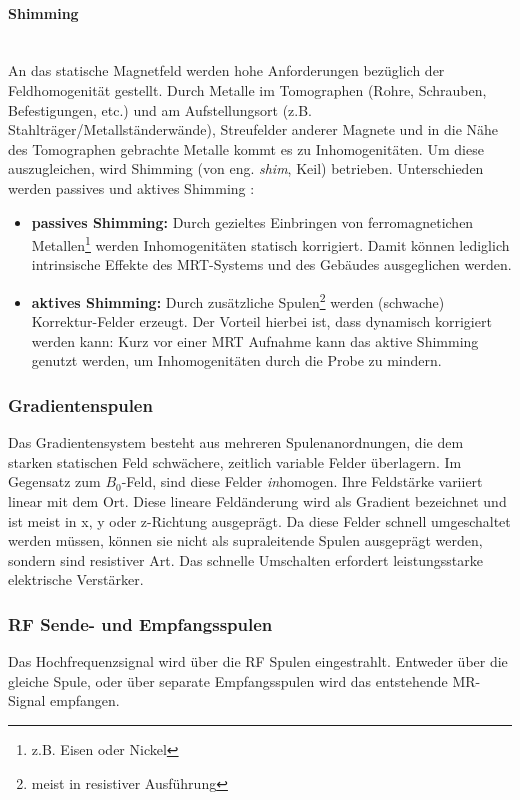 \paragraph{Shimming}\mbox{}\\
An das statische Magnetfeld werden hohe Anforderungen bezüglich der Feldhomogenität gestellt.
Durch Metalle im Tomographen (Rohre, Schrauben, Befestigungen, etc.) und am Aufstellungsort (z.B. Stahlträger/Metallständerwände), Streufelder anderer Magnete und in die Nähe des Tomographen gebrachte Metalle kommt es zu Inhomogenitäten.
Um diese auszugleichen, wird Shimming (von eng. \textit{shim}, Keil) betrieben. Unterschieden werden passives und aktives Shimming \cite{Lipton2008}:
\begin{itemize}
	\item \textbf{passives Shimming:} Durch gezieltes Einbringen von ferromagnetichen Metallen\footnote{z.B. Eisen oder Nickel} werden Inhomogenitäten statisch korrigiert. Damit können lediglich intrinsische Effekte des MRT-Systems und des Gebäudes ausgeglichen werden.
	\item \textbf{aktives Shimming:} Durch zusätzliche Spulen\footnote{meist in resistiver Ausführung} werden (schwache) Korrektur-Felder erzeugt. Der Vorteil hierbei ist, dass dynamisch korrigiert werden kann: Kurz vor einer MRT Aufnahme kann das aktive Shimming genutzt werden, um Inhomogenitäten  durch die Probe zu mindern.  
\end{itemize}

\subsubsection{Gradientenspulen}
Das Gradientensystem besteht aus mehreren Spulenanordnungen, die dem starken statischen Feld schwächere, zeitlich variable Felder überlagern. Im Gegensatz zum $B_0$-Feld, sind diese Felder \textit{in}homogen. Ihre Feldstärke variiert linear mit dem Ort. Diese lineare Feldänderung wird als Gradient bezeichnet und ist meist in x, y oder z-Richtung ausgeprägt. Da diese Felder schnell umgeschaltet werden müssen, können sie nicht als supraleitende Spulen ausgeprägt werden, sondern sind resistiver Art. Das schnelle Umschalten erfordert leistungsstarke elektrische Verstärker.

\subsubsection{RF Sende- und Empfangsspulen}
Das Hochfrequenzsignal wird über die RF Spulen eingestrahlt. Entweder über die gleiche Spule, oder über separate Empfangsspulen wird das entstehende MR-Signal empfangen.

